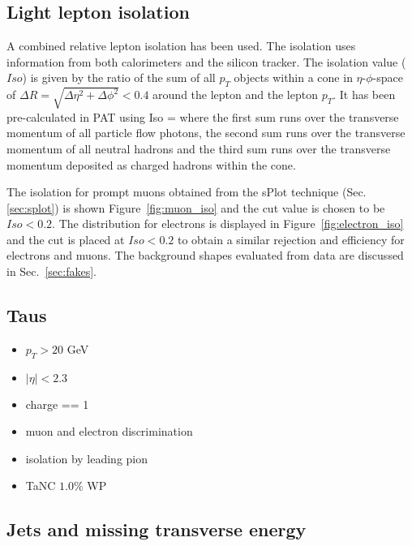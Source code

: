 \subsection{Light lepton isolation}\label{sec:isolation}

A combined relative lepton isolation has been used. The isolation uses information from both calorimeters and the silicon tracker. The isolation value ($Iso$) is given by the ratio of the sum of all $p_T$ objects within a cone in $\eta$-$\phi$-space of $\Delta R = \sqrt{\Delta \eta^2 + \Delta \phi^2 } < 0.4$ around the lepton and the lepton $p_T$. It has been pre-calculated in PAT using
\be
    Iso = 
\ee
where the first sum runs over the transverse momentum of all particle flow photons, the second sum runs over the transverse momentum of all neutral hadrons and the third sum runs over the transverse momentum deposited as charged hadrons within the cone.


The isolation for prompt muons obtained from the sPlot technique (Sec.\ref{sec:splot}) is shown Figure~\ref{fig:muon_iso} and the cut value is chosen to be $Iso<0.2$. The distribution for electrons is displayed in Figure~\ref{fig:electron_iso} and the cut is placed at $Iso<0.2$ to obtain a similar rejection and efficiency for electrons and muons. The background shapes evaluated from data are discussed in Sec.~\ref{sec:fakes}.

\subsection{Taus}\label{sec:taus}

\begin{itemize}
\item $p_T > 20$ GeV
\item $|\eta| < 2.3$
\item charge == 1
\item muon and electron discrimination
\item isolation by leading pion
\item TaNC $1.0\%$ WP
\end{itemize}

\subsection{Jets and missing transverse energy}\label{sec:jet}

